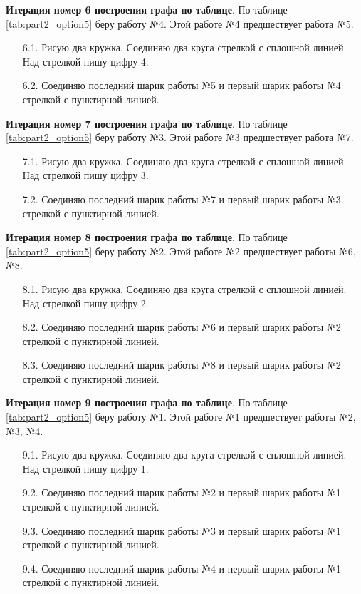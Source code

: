 \textbf{Итерация номер 6 построения графа по таблице}. По таблице \ref{tab:part2_option5} беру работу №4. Этой работе №4 предшествует работа №5.

\begin{enumerate}
  \item[6.1.] Рисую два кружка. Соединяю два круга стрелкой с сплошной линией. Над стрелкой пишу цифру 4.
  \item[6.2.] Соединяю последний шарик работы №5 и первый шарик работы №4 стрелкой с пунктирной линией.
\end{enumerate}

\textbf{Итерация номер 7 построения графа по таблице}. По таблице \ref{tab:part2_option5} беру работу №3. Этой работе №3 предшествует работа №7.

\begin{enumerate}
  \item[7.1.] Рисую два кружка. Соединяю два круга стрелкой с сплошной линией. Над стрелкой пишу цифру 3.
  \item[7.2.] Соединяю последний шарик работы №7 и первый шарик работы №3 стрелкой с пунктирной линией.
\end{enumerate}

\textbf{Итерация номер 8 построения графа по таблице}. По таблице \ref{tab:part2_option5} беру работу №2. Этой работе №2 предшествует работы №6, №8.

\begin{enumerate}
  \item[8.1.] Рисую два кружка. Соединяю два круга стрелкой с сплошной линией. Над стрелкой пишу цифру 2.
  \item[8.2.] Соединяю последний шарик работы №6 и первый шарик работы №2 стрелкой с пунктирной линией.
  \item[8.3.] Соединяю последний шарик работы №8 и первый шарик работы №2 стрелкой с пунктирной линией.
\end{enumerate}

\textbf{Итерация номер 9 построения графа по таблице}. По таблице \ref{tab:part2_option5} беру работу №1. Этой работе №1 предшествует работы №2, №3, №4.

\begin{enumerate}
  \item[9.1.] Рисую два кружка. Соединяю два круга стрелкой с сплошной линией. Над стрелкой пишу цифру 1.
  \item[9.2.] Соединяю последний шарик работы №2 и первый шарик работы №1 стрелкой с пунктирной линией.
  \item[9.3.] Соединяю последний шарик работы №3 и первый шарик работы №1 стрелкой с пунктирной линией.
  \item[9.4.] Соединяю последний шарик работы №4 и первый шарик работы №1 стрелкой с пунктирной линией.
\end{enumerate}


